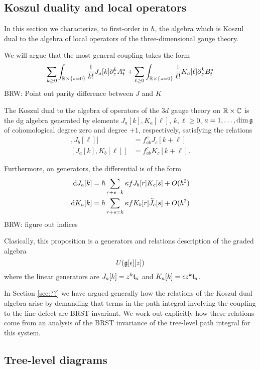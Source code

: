 \documentclass[11pt]{amsart}
\def\brian#1{{\textcolor{blue!65!red}{BRW: {#1}}}}
\begin{document}
\subsection*{Koszul duality and local operators}

In this section we characterize, to first-order in $\hbar$, the algebra which is Koszul dual to the algebra of local operators of the three-dimensional gauge theory.

We will argue that the most general coupling takes the form
\[
\sum_{k \geq 0} \int_{\mathbb R \times \{z=0\}} \frac{1}{k!} J_a [k] \partial_z^k A^a_t + \sum_{\ell \geq 0} \int_{\mathbb R \times \{z=0\}} \frac{1}{\ell!} K_a[\ell] \partial_z^k B_t^a 
\] 
\brian{Point out parity difference between $J$ and $K$}

\begin{prop}
The Koszul dual to the algebra of operators of the $3d$ gauge theory on $\mathbb R \times \mathbb C$ is the dg algebra generated by elements $J_a[k],K_a [\ell]$, $k,\ell \geq 0$, $a = 1,\ldots, \dim \mathfrak g$ of cohomological degree zero and degree $+1$, respectively, satisfying the relations
\begin{align*}
[J_a [k] , J_b [\ell]] & = f_{ab}^c J_{c} [k+\ell] \\
[J_a [k], K_b[\ell]] & = f_{ab}^c K_c [k+\ell] .
\end{align*} 

Furthermore, on generators, the differential is of the form
\begin{align*}
{\rm d} J_a[k] & = \hbar \sum_{r + s = k} \kappa f J_b[r] K_c[s] + O(\hbar^2) \\
{\rm d} K_a[k] & = \hbar \sum_{r + s = k} \kappa f K_b[r] \widetilde{J}_c[s] + O(\hbar^2)
\end{align*} 
\brian{figure out indices}
\end{prop}

Clasically, this proposition is a generators and relations description of the graded algebra 
\[
U(\mathfrak g[\epsilon][z])
\]
where the linear generators are $J_a[k] = z^k \mathfrak t_a$ and $K_a [k] = \epsilon z^k \mathfrak t_a$. 


In Section \ref{sec:??} we have argued generally how the relations of the Koszul dual algebra arise by demanding that terms in the path integral involving the coupling to the line defect are BRST invariant. 
We work out explicitly how these relations come from an analysis of the BRST invariance of the tree-level path integral for this system.

\subsection*{Tree-level diagrams}
\end{document}
